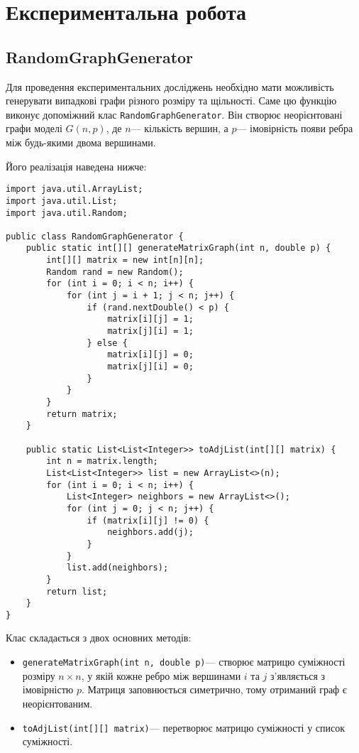 \documentclass[12pt,a4paper]{article}
\begin{document}
\section{Експериментальна робота}
\subsection{RandomGraphGenerator}
Для проведення експериментальних досліджень необхідно мати можливість 
 генерувати випадкові графи різного розміру та щільності. 
Саме цю функцію виконує допоміжний клас \texttt{RandomGraphGenerator}. 
Він створює неорієнтовані графи моделі $G(n,p)$, 
де $n$--- кількість вершин, а $p$--- імовірність появи ребра між будь-якими двома вершинами.

Його реалізація наведена нижче:
\begin{lstlisting}[style=javastyle
]
import java.util.ArrayList;
import java.util.List;
import java.util.Random;

public class RandomGraphGenerator {
    public static int[][] generateMatrixGraph(int n, double p) {
        int[][] matrix = new int[n][n];
        Random rand = new Random();
        for (int i = 0; i < n; i++) {
            for (int j = i + 1; j < n; j++) {
                if (rand.nextDouble() < p) {
                    matrix[i][j] = 1;
                    matrix[j][i] = 1;  
                } else {
                    matrix[i][j] = 0;
                    matrix[j][i] = 0;
                }
            }
        }
        return matrix;
    }

    public static List<List<Integer>> toAdjList(int[][] matrix) {
        int n = matrix.length;
        List<List<Integer>> list = new ArrayList<>(n);
        for (int i = 0; i < n; i++) {
            List<Integer> neighbors = new ArrayList<>();
            for (int j = 0; j < n; j++) {
                if (matrix[i][j] != 0) {
                    neighbors.add(j);
                }
            }
            list.add(neighbors);
        }
        return list;
    }
}
\end{lstlisting}

Клас складається з двох основних методів:
\begin{itemize}
    \item \texttt{generateMatrixGraph(int n, double p)}--- 
    створює матрицю суміжності розміру $n \times n$, 
    у якій кожне ребро між вершинами $i$ та $j$ 
    з’являється з імовірністю $p$. 
    Матриця заповнюється симетрично, тому отриманий граф є неорієнтованим.

    \item \texttt{toAdjList(int[][] matrix)}--- 
    перетворює матрицю суміжності у список суміжності. 
\end{itemize}
\end{document}
